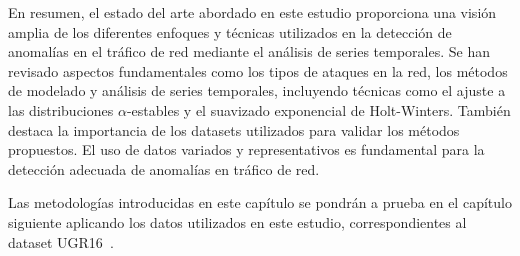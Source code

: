 En resumen, el estado del arte abordado en este estudio proporciona una visión amplia de los diferentes enfoques y técnicas utilizados en la detección de anomalías en el tráfico de red mediante el análisis de series temporales. Se han revisado aspectos fundamentales como los tipos de ataques en la red, los métodos de modelado y análisis de series temporales, incluyendo técnicas como el ajuste a las distribuciones $\alpha$-estables y el suavizado exponencial de Holt-Winters. También destaca la importancia de los datasets utilizados para validar los métodos propuestos.
El uso de datos variados y representativos es fundamental para la detección adecuada de anomalías en tráfico de red.

Las metodologías introducidas en este capítulo se pondrán a prueba en el capítulo siguiente aplicando los datos utilizados en este estudio, correspondientes al dataset UGR16~\cite{datosugr16}.
